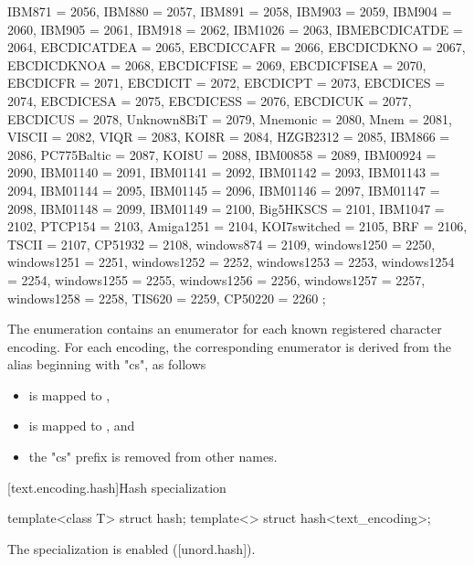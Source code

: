 \documentclass{wg21}
\begin{document}
\begin{addedblock}
\begin{codeblock}
{        IBM871 = 2056,
        IBM880 = 2057,
        IBM891 = 2058,
        IBM903 = 2059,
        IBM904 = 2060,
        IBM905 = 2061,
        IBM918 = 2062,
        IBM1026 = 2063,
        IBMEBCDICATDE = 2064,
        EBCDICATDEA = 2065,
        EBCDICCAFR = 2066,
        EBCDICDKNO = 2067,
        EBCDICDKNOA = 2068,
        EBCDICFISE = 2069,
        EBCDICFISEA = 2070,
        EBCDICFR = 2071,
        EBCDICIT = 2072,
        EBCDICPT = 2073,
        EBCDICES = 2074,
        EBCDICESA = 2075,
        EBCDICESS = 2076,
        EBCDICUK = 2077,
        EBCDICUS = 2078,
        Unknown8BiT = 2079,
        Mnemonic = 2080,
        Mnem = 2081,
        VISCII = 2082,
        VIQR = 2083,
        KOI8R = 2084,
        HZGB2312 = 2085,
        IBM866 = 2086,
        PC775Baltic = 2087,
        KOI8U = 2088,
        IBM00858 = 2089,
        IBM00924 = 2090,
        IBM01140 = 2091,
        IBM01141 = 2092,
        IBM01142 = 2093,
        IBM01143 = 2094,
        IBM01144 = 2095,
        IBM01145 = 2096,
        IBM01146 = 2097,
        IBM01147 = 2098,
        IBM01148 = 2099,
        IBM01149 = 2100,
        Big5HKSCS = 2101,
        IBM1047 = 2102,
        PTCP154 = 2103,
        Amiga1251 = 2104,
        KOI7switched = 2105,
        BRF = 2106,
        TSCII = 2107,
        CP51932 = 2108,
        windows874 = 2109,
        windows1250 = 2250,
        windows1251 = 2251,
        windows1252 = 2252,
        windows1253 = 2253,
        windows1254 = 2254,
        windows1255 = 2255,
        windows1256 = 2256,
        windows1257 = 2257,
        windows1258 = 2258,
        TIS620 = 2259,
        CP50220 = 2260
    };
\end{codeblock}

\begin{note}
    The  enumeration contains an enumerator for each known registered character encoding.
    For each encoding, the corresponding enumerator is derived from the alias beginning with "cs", as follows
    \begin{itemize}
        \item {} is mapped to ,
        \item {} is mapped to , and
        \item the "cs" prefix is removed from other names.
    \end{itemize}
\end{note}


[text.encoding.hash]{Hash specialization}

\begin{itemdecl}
template<class T> struct hash;
template<> struct hash<text_encoding>;
\end{itemdecl}

\begin{itemdescr}
The specialization is enabled ([unord.hash]).
\end{itemdescr}



\end{addedblock}
\end{document}
